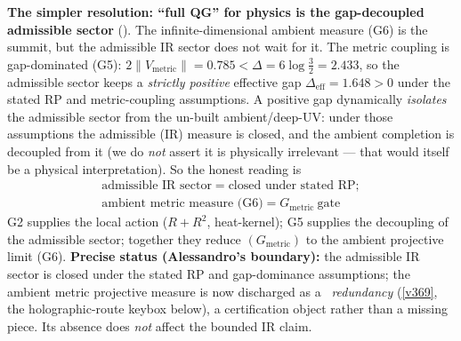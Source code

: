 \par\smallskip\noindent\textbf{The simpler resolution: ``full QG'' for physics is the gap-decoupled admissible sector} (\mE).
The infinite-dimensional ambient measure (G6) is the summit, but the admissible IR sector does not wait for
it. The metric coupling is gap-dominated (G5): $2\|V_{\mathrm{metric}}\|=0.785<\Delta=6\log\tfrac32=2.433$,
so the admissible sector keeps a \emph{strictly positive} effective gap $\Delta_{\mathrm{eff}}=1.648>0$
under the stated RP and metric-coupling assumptions. A positive gap dynamically \emph{isolates} the
admissible sector from the un-built ambient/deep-UV: under those assumptions the admissible (IR) measure is
closed, and the ambient completion is decoupled from it (we do \emph{not} assert it is physically
irrelevant --- that would itself be a physical interpretation). So the honest reading is
\[
  \boxed{\ \begin{gathered}
  \text{admissible IR sector}=\text{closed under stated RP};\\[2pt]
  \text{ambient metric measure (G6)}=G_{\mathrm{metric}}\ \text{gate}
  \end{gathered}\ }
\]
G2 supplies the local action ($R+R^2$, heat-kernel); G5 supplies the decoupling of the admissible sector;
together they reduce $(G_{\mathrm{metric}})$ to the ambient projective limit (G6). \textbf{Precise status
(Alessandro's boundary):} the admissible IR sector is closed under the stated RP and gap-dominance
assumptions; the ambient metric projective measure is now discharged as a \mC\ \emph{redundancy} (\vref{v369},
the holographic-route keybox below), a certification object rather than a missing piece. Its
absence does \emph{not} affect the bounded IR claim. 



